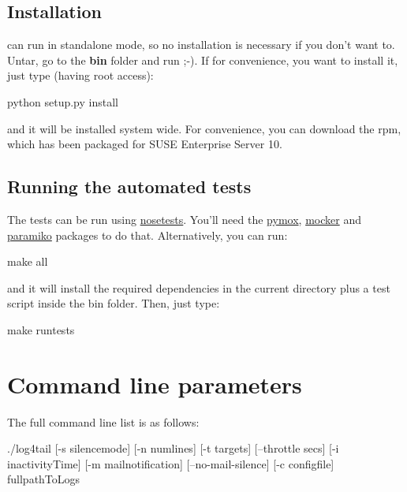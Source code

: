 \subsection{Installation}
\logftailer{} can run in standalone mode, so no installation is necessary if you don't want to. 
Untar, go to the \textbf{bin} folder and run ;-).
If for convenience, you want to install it, just type (having root access):
\begin{cmd}
 python setup.py install
\end{cmd}
and it will be installed system wide. For convenience, you can download the rpm, which has been packaged 
for SUSE Enterprise Server 10.

\subsection{Running the automated tests}
The tests can be run using \href{http://somethingaboutorange.com/mrl/projects/nose/0.11.3/}
{nosetests}. You'll need the \href{http://code.google.com/p/pymox/}{pymox}, 
\href{http://labix.org/mocker}{mocker} and 
\href{http://www.lag.net/paramiko/packages}{paramiko} packages to do that.
Alternatively, you can run:
\begin{cmd}
 make all
\end{cmd}
and it will install the required dependencies in the current directory plus a test script 
inside the bin folder. Then, just type:
\begin{cmd}
 make runtests
\end{cmd}

\section{Command line parameters}
The full command line list is as follows:
\begin{cmd}
 ./log4tail [-s silencemode] [-n numlines] [-t targets] [--throttle secs] [-i inactivityTime] 
                 [-m mailnotification] [--no-mail-silence] [-c configfile] fullpathToLogs
\end{cmd}


\newpage
